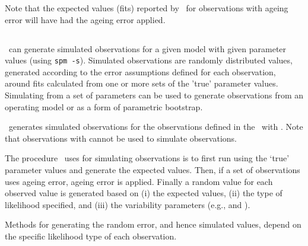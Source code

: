 Note that the expected values (fits) reported by \SPM\ for observations with ageing error will have had the ageing error applied. 

\subsection{\label{sec:simulation-observations}}

\SPM\ can generate simulated observations for a given model with given parameter values (using \texttt{spm -s}). Simulated observations are randomly distributed values, generated according to the error assumptions defined for each observation, around fits calculated from one or more sets of the 'true' parameter values. Simulating from a set of parameters can be used to generate observations from an operating model or as a form of parametric bootstrap. 

\SPM\ generates simulated observations for the observations defined in the \config\ with . Note that observations with  cannot be used to simulate observations.

The procedure \SPM\ uses for simulating observations is to first run using the `true' parameter values and generate the expected values. Then, if a set of observations uses ageing error, ageing error is applied. Finally a random value for each observed value is generated based on (i) the expected values, (ii) the type of likelihood specified, and (iii) the variability parameters (e.g.,  and ). 

Methods for generating the random error, and hence simulated values, depend on the specific likelihood type of each observation. 

